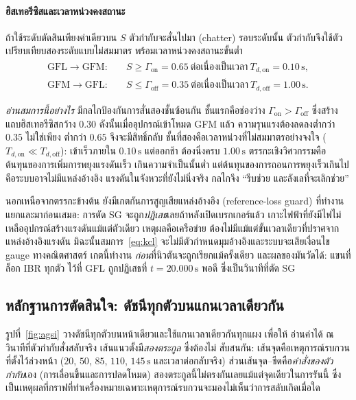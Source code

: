 \documentclass[12pt,a4paper]{article}
\newcommand{\second}{\,\mathrm{s}}
\begin{document}
\paragraph{ฮิสเทอรีซิสและเวลาหน่วงคงสถานะ}
ถ้าใช้ระดับตัดสินเพียงค่าเดียวบน $S$ ตัวกำกับจะสั่นไปมา (chatter) รอบระดับนั้น
ตัวกำกับจึงใช้ตัวเปรียบเทียบสองระดับแบบไม่สมมาตร พร้อมเวลาหน่วงคงสถานะขั้นต่ำ
\begin{equation}
  \begin{aligned}
    \text{GFL}\to\text{GFM}:&\quad S\ge\Gamma_{\mathrm{on}}=0.65
       \ \text{ต่อเนื่องเป็นเวลา}\ T_{d,\mathrm{on}}=0.10\second,\\
    \text{GFM}\to\text{GFL}:&\quad S\le\Gamma_{\mathrm{off}}=0.35
       \ \text{ต่อเนื่องเป็นเวลา}\ T_{d,\mathrm{off}}=1.00\second.
  \end{aligned}
  \label{eq:hyst}
\end{equation}

\emph{อ่านสมการนี้อย่างไร} มีกลไกป้องกันการสั่นสองชั้นซ้อนกัน ชั้นแรกคือช่องว่าง
$\Gamma_{\mathrm{on}}>\Gamma_{\mathrm{off}}$ ซึ่งสร้างแถบฮิสเทอรีซิสกว้าง $0.30$
ดังนั้นเมื่ออุปกรณ์เข้าโหมด GFM แล้ว ความรุนแรงต้องลดลงต่ำกว่า $0.35$ ไม่ใช่เพียง
ต่ำกว่า $0.65$ จึงจะมีสิทธิ์กลับ ชั้นที่สองคือเวลาหน่วงที่ไม่สมมาตรอย่างจงใจ
($T_{d,\mathrm{on}}\ll T_{d,\mathrm{off}}$): เข้าเร็วภายใน $0.10\second$ แต่ออกช้า
ต้องนิ่งครบ $1.00\second$ ตรรกะเชิงวิศวกรรมคือ ต้นทุนของการเพิ่มการพยุงแรงดันเร็ว
เกินความจำเป็นนั้นต่ำ แต่ต้นทุนของการถอนการพยุงเร็วเกินไปคือระบบอาจไม่มีแหล่งอ้างอิง
แรงดันในจังหวะที่ยังไม่นิ่งจริง กลไกจึง ``รีบช่วย และลังเลที่จะเลิกช่วย''

นอกเหนือจากตรรกะข้างต้น ยังมีเกตกันการสูญเสียแหล่งอ้างอิง (reference-loss guard)
ที่ทำงานแยกและมาก่อนเสมอ: การตัด SG จะถูก\emph{ปฏิเสธ}เลยถ้าหลังเปิดเบรกเกอร์แล้ว
เกาะไฟฟ้าที่ยังมีไฟไม่เหลืออุปกรณ์สร้างแรงดันแม้แต่ตัวเดียว เหตุผลคือเครือข่าย
ต้องไม่มีแม้แต่ขั้นเวลาเดียวที่ปราศจากแหล่งอ้างอิงแรงดัน มิฉะนั้นสมการ~\eqref{eq:kcl}
จะไม่มีตัวกำหนดมุมอ้างอิงและระบบจะเสียเงื่อนไข gauge ทางคณิตศาสตร์ เกตนี้ทำงาน
\emph{ก่อน}ที่นิวตันจะถูกเรียกแม้ครั้งเดียว และผลของมันวัดได้: แขนที่ล็อก IBR ทุกตัว
ไว้ที่ GFL ถูกปฏิเสธที่ $t=20.000\second$ พอดี ซึ่งเป็นวินาทีที่ตัด SG

\subsection{หลักฐานการตัดสินใจ: ดัชนีทุกตัวบนแกนเวลาเดียวกัน}\label{sec:agsi-fig}
รูปที่~\ref{fig:agsi} วางดัชนีทุกตัวบนหน้าเดียวและใช้แกนเวลาเดียวกันทุกแผง เพื่อให้
อ่านค่าได้ ณ วินาทีที่ตัวกำกับสั่งสลับจริง เส้นแนวตั้งมี\emph{สองตระกูล} ซึ่งต้องไม่
สับสนกัน: เส้นจุดคือเหตุการณ์รบกวนที่ตั้งไว้ล่วงหน้า ($20$, $50$, $85$, $110$,
$145\second$ และเวลาต่อกลับจริง) ส่วนเส้นจุด--ขีดคือ\emph{คำสั่งของตัวกำกับ}เอง
(การเลื่อนขึ้นและการปลดโหมด) สองตระกูลนี้ไม่ตรงกันเลยแม้แต่จุดเดียวในการรันนี้ ซึ่ง
เป็นเหตุผลที่กราฟที่ทำเครื่องหมายเฉพาะเหตุการณ์รบกวนจะมองไม่เห็นว่าการสลับเกิดเมื่อใด
\end{document}
